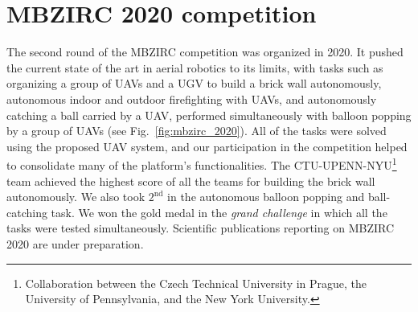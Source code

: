 \documentclass[a4paper,11pt,titlepage,twoside]{book}
\newcommand{\reffig}[1]{Fig.~\ref{#1}}
\begin{document}



\section{MBZIRC 2020 competition}

The second round of the \ac{MBZIRC} competition was organized in 2020.
It pushed the current state of the art in aerial robotics to its limits, with tasks such as organizing a group of \acp{UAV} and a \ac{UGV} to build a brick wall autonomously, autonomous indoor and outdoor firefighting with \acp{UAV}, and autonomously catching a ball carried by a \ac{UAV}, performed simultaneously with balloon popping by a group of \acp{UAV} (see \reffig{fig:mbzirc_2020}).
All of the tasks were solved using the proposed \ac{UAV} system, and our participation in the competition helped to consolidate many of the platform's functionalities.
The CTU-UPENN-NYU\footnote{Collaboration between the Czech Technical University in Prague, the University of Pennsylvania, and the New York University.} team achieved the highest score of all the teams for building the brick wall autonomously.
We also took $2^{\text{nd}}$ in the autonomous balloon popping and ball-catching task.
We won the gold medal in the \emph{grand challenge} in which all the tasks were tested simultaneously.
Scientific publications reporting on \ac{MBZIRC} 2020 are under preparation.

\end{document}
